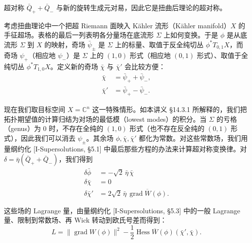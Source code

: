 超对称 $\bar Q_++\bar Q_-$ 与新的旋转生成元对易，因此它是扭曲后理论的超对称。

考虑扭曲理论中一个把超 Riemann 面映入 Kähler 流形（Kähler manifold）$X$ 的手征超场。表格的最后一列表明各分量场在底流形 $\Sigma$ 上如何变换。于是 $\phi$ 是从底流形 $\Sigma$ 到 $X$ 的映射，奇场 $\bar\psi_\pm$ 是 $\Sigma$ 上的标量、取值于反全纯切丛 $\phi^*T_{0,1}X$，而奇场 $\psi_+$（相应地 $\psi_-$）是 $\Sigma$ 上的 $(1,0)$ 形式（相应地 $(0,1)$ 形式）、取值于全纯切丛 $\phi^*T_{1,0}X$。定义新的奇场 $\bar\chi$ 与 $\bar\chi'$ 会比较方便：
\begin{equation}
  \begin{aligned}
    \bar\chi&=\bar\psi_++\bar\psi_-,\\
    \bar\chi'&=\bar\psi_+-\bar\psi_- .
  \end{aligned}
  \tag{10.1}
  \label{eq:sol10-1}
\end{equation}

现在我们取目标空间 $X=\mathbb{C}^n$ 这一特殊情形。如本讲义 §14.3.1 所解释的，我们把拓扑期望值的计算归结为对场的最低模（lowest modes）的积分。当 $\Sigma$ 的亏格（genus）为 0 时，不存在全纯的 $(1,0)$ 形式（也不存在反全纯的 $(0,1)$ 形式），因此我们可以消去 $\psi_\pm$。其余场 $\phi,\bar\chi,\bar\chi'$ 都化为常数。对这些常数场，我们用量纲约化 [I-Supersolutions, §5.1] 中最后那些方程的办法来计算超对称变换律。对 $\delta=\bar\eta(\bar Q_++\bar Q_-)$，我们得到
\[
\begin{aligned}
\delta\bar\phi&=-\sqrt2\,\bar\eta\,\bar\chi\\
\delta\bar\chi&=0\\
\delta\bar\chi'&=2\sqrt2\,\bar\eta\,\overline{\operatorname{grad}W(\phi)}.
\end{aligned}
\]

这些场的 Lagrange 量，由量纲约化 [I-Supersolutions, §5.3] 中的一般 Lagrange 量、限制到常数场、再 Wick 转动到欧氏号差而得到：
\[
L=\|\operatorname{grad}W(\phi)\|^2-\frac12\operatorname{Hess}\overline{W}(\phi)(\bar\chi',\bar\chi).
\]
